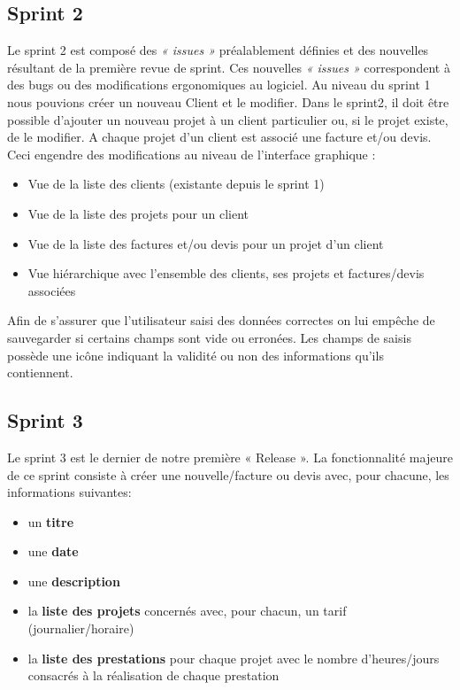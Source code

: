 \documentclass[12pt,a4paper,openany]{article}
\begin{document}
	\subsection{Sprint 2}
	Le sprint 2 est composé des \textit{« issues »} préalablement définies et des nouvelles résultant de la première revue de sprint. Ces nouvelles \textit{« issues »} correspondent à des bugs ou des modifications ergonomiques au logiciel. 
	Au niveau du sprint 1 nous pouvions créer un nouveau Client et le modifier. Dans le sprint2, il doit être possible d'ajouter un nouveau projet à un client particulier ou, si le projet existe, de le modifier. A chaque projet d'un client est associé une facture et/ou devis. Ceci engendre des modifications au niveau de l'interface graphique :
	\begin{itemize}
		\item Vue de la liste des clients (existante depuis le sprint 1)
		\item Vue de la liste des projets pour un client
		\item Vue de la liste des factures et/ou devis pour un projet d'un client
		\item Vue hiérarchique avec l'ensemble des clients, ses projets et factures/devis associées
	\end{itemize}
	Afin de s'assurer que l'utilisateur saisi des données correctes on lui empêche de sauvegarder si certains champs sont vide ou erronées. Les champs de saisis possède une icône indiquant la validité ou non des informations qu'ils contiennent. 
	
	\subsection{Sprint 3}
	Le sprint 3 est le dernier de notre première « Release ». La fonctionnalité majeure de ce sprint consiste à créer une nouvelle/facture ou devis avec, pour chacune, les informations suivantes:
	\begin{itemize}
		\item un \textbf{titre}
		\item une \textbf{date}
		\item une \textbf{description}
		\item la \textbf{liste des projets} concernés avec, pour chacun, un tarif (journalier/horaire)
		\item la \textbf{liste des prestations} pour chaque projet avec le nombre d'heures/jours consacrés à la réalisation de chaque prestation
	\end{itemize}
	
\end{document}
